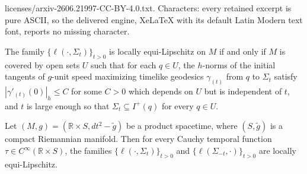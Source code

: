 \documentclass[10pt,a4paper]{amsart}
\newcommand{\R}{\mathbb R}
\begin{document}
licenses/arxiv-2606.21997-CC-BY-4.0.txt. Characters: every retained excerpt is pure ASCII, so the delivered engine, XeLaTeX with its default Latin Modern text font, reports no missing character.
\begin{Lemma}
\label{Lemma: blowup of initial tangents}
The family $\{\ell(\cdot,\Sigma_t)\}_{t > 0}$ is locally equi-Lipschitz on $M$ if and only if $M$ is covered by open sets $U$ such that for each $q \in U$, the $h$-norms of the initial tangents of $g$-unit speed maximizing timelike geodesics $\gamma_{(t)}$ from $q$ to $\Sigma_t$ satisfy $|\gamma'_{(t)}(0)|_h \leq C$ for some $C > 0$ which depends on $U$ but is independent of $t$, and $t$ is large enough so that $\Sigma_t \subseteq I^+(q)$ for every $q \in U$.
\end{Lemma}

\begin{Proposition}\label{P:compact splitting implies equi-Lipschitz}
    Let $(M,g) = (\R \times S, dt^2 - \tilde g)$ be a product spacetime, where $(S,\tilde g)$ is a compact Riemannian manifold. Then for every Cauchy temporal function $\tau \in C^\infty(\R \times S)$, the families $\{\ell(\cdot,\Sigma_t)\}_{t > 0}$ and $\{\ell(\Sigma_{-t},\cdot)\}_{t > 0}$ are locally equi-Lipschitz.
\end{Proposition}
\end{document}
